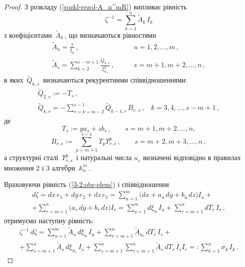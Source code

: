 \documentclass[11pt, reqno]{amsart}
\begin{document}
\begin{proof} 
З розкладу (\ref{rozkl-rezol-A_n^mR}) випливає рівність
\begin{equation}\label{3-2:obr-elem}
\zeta^{-1}=\sum\limits_{k=1}^n\widetilde{A}_k\,I_k
\end{equation}
з коефіцієнтами\, $\widetilde{A}_k$\,, що визначаються рівностями
\begin{equation}\label{3-2:A__p}
\begin{array}{ll}
\displaystyle \widetilde{A}_u=\frac{1}{\xi_u}\,,& \qquad u=1,2,\ldots,m\,,\\[4mm]
 \displaystyle
\widetilde{A}_s=\sum\limits_{k=2}^{s-m+1}\frac{\widetilde{Q}_{k,s}}{\xi_{u_s}^k}\,,& \qquad
s=m+1,m+2,\ldots,n\,,
\end{array}
\end{equation}
в яких\, $\widetilde{Q}_{k,s}$\, визначаються рекурентними співвідношеннями:
\begin{multline}\label{3-2:lem_3_2--}
\widetilde{Q}_{2,s}:=-T_{s}\,, \\
\widetilde{Q}_{k,s}=-\sum\limits_{r=k+m-2}^{s-1}\widetilde{Q}_{k-1,r}\,B_{r,\,s}\,,\; \;\;k=3,4,\ldots,s-m+1\,,
\end{multline}
де
\begin{equation}\label{3-2:lem_1_T_p}
T_s:=ya_s+zb_s\,,\qquad s=m+1,m+2,\ldots,n,
\end{equation}
\begin{equation}\label{3-2:lem_1_B_p}
B_{r,s}:=\sum\limits_{p=m+1}^{s-1}T_p \Upsilon_{r,s}^p\,,\qquad s=m+2,m+3,\ldots,n\,,
\end{equation}
а структурні сталі\, $\Upsilon_{r,s}^p$\, і натуральні числа $u_s$ визначені відповідно
в правилах множення 2 і 3 алгебри\, $\mathbb{A}_n^m$\,.


Враховуючи рівність (\ref{3-2:obr-elem}) і співвідношення
\begin{multline*}
d\zeta=dx\,e_1+dy\,e_2+dz\,e_3=\sum\limits_{u=1}^m\Big(dx+a_u\,dy+b_u\,dz\Big)I_u+\\
+\sum\limits_{r=m+1}^n\Big(a_r\,dy+b_r\,dz\Big)I_r
=\sum\limits_{u=1}^md\xi_u\,I_u+\sum\limits_{r=m+1}^n dT_r\,I_r\,,
\end{multline*}
отримуємо наступну рівність:
\begin{multline}\label{3-2:obr-elem-0}
\zeta^{-1}\,d\zeta=\sum\limits_{u=1}^m\widetilde{A}_u\,d\xi_u\,I_u+
\sum\limits_{r=m+1}^n\widetilde{A}_{u_r}\,dT_r\,I_r+\\
+\sum\limits_{s=m+1}^n\widetilde{A}_{s}\,d\xi_{u_s}\,I_s+
\sum\limits_{s=m+1}^n\sum\limits_{r=m+1}^n\widetilde{A}_{s}\,dT_r\,I_sI_r=:
\sum\limits_{k=1}^n\sigma_k\,I_k\,.
\end{multline}


\end{proof}
\end{document}
